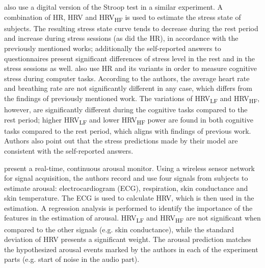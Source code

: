 \textcite{bousefsaf2013remote} also use a digital version of the Stroop test in a similar experiment. A combination of HR, HRV and HRV\textsubscript{HF} is used to estimate the stress state of subjects. The resulting stress state curve tends to decrease during the rest period and increase during stress sessions (as did the HR), in accordance with the previously mentioned works; additionally the self-reported answers to questionnaires present significant differences of stress level in the rest and in the stress sessions as well. \textcite{mcduff2014remote,mcduffcogcam} also use HR and its variants in order to measure cognitive stress during computer tasks. According to the authors, the average heart rate and breathing rate are not significantly different in any case, which differs from the findings of previously mentioned work. The variations of HRV\textsubscript{LF} and HRV\textsubscript{HF}, however, are significantly different during the cognitive tasks compared to the rest period; higher HRV\textsubscript{LF} and lower HRV\textsubscript{HF} power are found in both cognitive tasks compared to the rest period, which aligns with findings of previous work. Authors also point out that the stress predictions made by their model are consistent with the self-reported answers.

\textcite{grundlehner2009design} present a real-time, continuous arousal monitor. Using a wireless sensor network for signal acquisition, the authors record and use four signals from subjects to estimate arousal: electrocardiogram (ECG), respiration, skin conductance and skin temperature. The ECG is used to calculate HRV, which is then used in the estimation. A regression analysis is performed to identify the importance of the features in the estimation of arousal. HRV\textsubscript{LF} and HRV\textsubscript{HF} are not significant when compared to the other signals (e.g. skin conductance), while the standard deviation of HRV presents a significant weight. The arousal prediction matches the hypothesized arousal events marked by the authors in each of the experiment parts (e.g. start of noise in the audio part).

